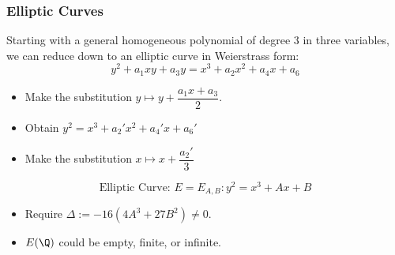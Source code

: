 \begin{frame}[plain] \frametitle{Elliptic Curves}
\footnotesize
Starting with a general homogeneous polynomial of degree 3 in three variables, we can reduce down to an elliptic curve in Weierstrass form:
	\[
	y^2 + a_1 xy + a_3y = x^3 + a_2 x^2 + a_4 x + a_6
	\] \pspace 

\begin{itemize}
\item Make the substitution $y \mapsto y + \dfrac{a_1 x+a_3}{2}$.
\item Obtain $y^2= x^3+ a_2' x^2 + a_4' x + a_6'$
\item Make the substitution $x \mapsto x + \dfrac{a_2'}{3}$
\end{itemize} \pspace 
	\[
	\text{Elliptic Curve: } E= E_{A,B}: y^2 = x^3 + Ax + B
	\] \pspace

\begin{itemize}
\item Require $\Delta:= -16(4A^3+27B^2) \neq 0$.
\item $E(\Q)$ could be empty, finite, or infinite. 
\end{itemize}
\end{frame}





